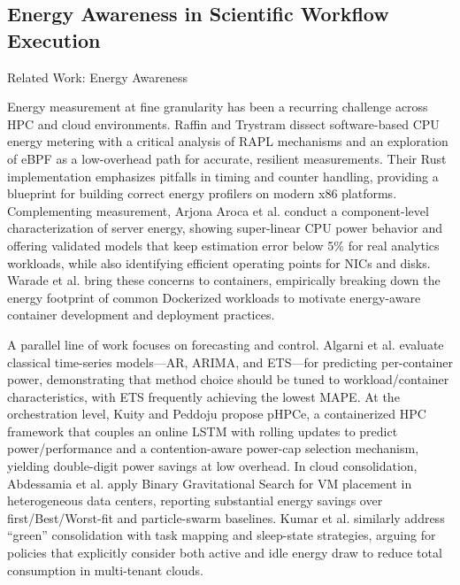 \subsection{Energy Awareness in Scientific Workflow Execution}
\label{sec:relatedwork_energy_awareness_scientific_workflow_execution}
Related Work: Energy Awareness

Energy measurement at fine granularity has been a recurring challenge across HPC and cloud environments. Raffin and Trystram dissect software-based CPU energy metering with a critical analysis of RAPL mechanisms and an exploration of eBPF as a low-overhead path for accurate, resilient measurements. Their Rust implementation emphasizes pitfalls in timing and counter handling, providing a blueprint for building correct energy profilers on modern x86 platforms. Complementing measurement, Arjona Aroca et al. conduct a component-level characterization of server energy, showing super-linear CPU power behavior and offering validated models that keep estimation error below 5\% for real analytics workloads, while also identifying efficient operating points for NICs and disks. Warade et al. bring these concerns to containers, empirically breaking down the energy footprint of common Dockerized workloads to motivate energy-aware container development and deployment practices.

A parallel line of work focuses on forecasting and control. Algarni et al. evaluate classical time-series models—AR, ARIMA, and ETS—for predicting per-container power, demonstrating that method choice should be tuned to workload/container characteristics, with ETS frequently achieving the lowest MAPE. At the orchestration level, Kuity and Peddoju propose pHPCe, a containerized HPC framework that couples an online LSTM with rolling updates to predict power/performance and a contention-aware power-cap selection mechanism, yielding double-digit power savings at low overhead. In cloud consolidation, Abdessamia et al. apply Binary Gravitational Search for VM placement in heterogeneous data centers, reporting substantial energy savings over first/Best/Worst-fit and particle-swarm baselines. Kumar et al. similarly address “green” consolidation with task mapping and sleep-state strategies, arguing for policies that explicitly consider both active and idle energy draw to reduce total consumption in multi-tenant clouds.

